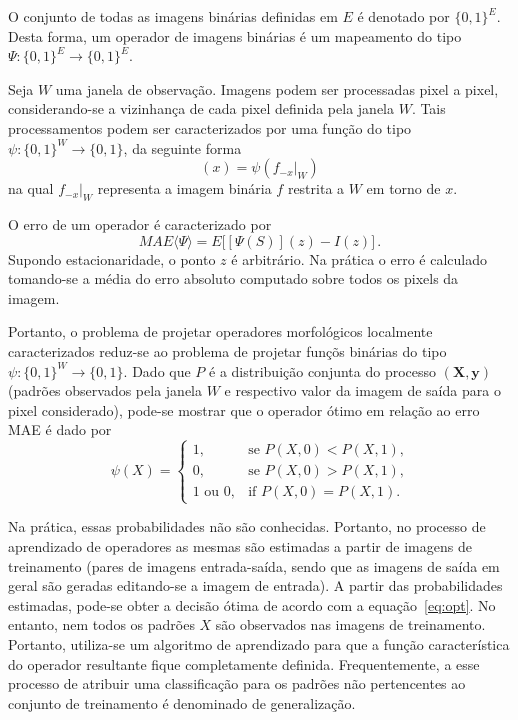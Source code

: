 \documentclass[times, 10pt,twocolumn]{article}
\begin{document}
O conjunto de todas as imagens binárias definidas em $E$ é denotado
por $\{0,1\}^E$. Desta forma, um operador de imagens binárias é um
mapeamento do tipo $\Psi: \{0,1\}^E \to \{0,1\}^E$. 

Seja $W$ uma janela de observação. Imagens podem ser processadas pixel
a pixel, considerando-se a vizinhança de cada pixel definida pela
janela $W$. Tais processamentos podem ser caracterizados por uma
função do tipo $\psi: \{0,1\}^W \to \{0,1\}$, da seguinte forma
\begin{equation}
[\Psi(f)](x) = \psi(f_{-x}|_W)
\end{equation} 
na qual $f_{-x}|_W$ representa a imagem binária $f$ restrita a $W$ em
torno de $x$. 



O erro de um operador é caracterizado por
\begin{equation}
MAE\langle \Psi \rangle = E \big[ [\Psi(S)](z) - I(z) \big]\,.
\end{equation}
Supondo estacionaridade, o ponto $z$ é arbitrário. Na prática o erro é
calculado tomando-se a média do erro absoluto computado sobre
todos os pixels da imagem.

Portanto, o problema de projetar operadores morfológicos localmente
caracterizados reduz-se ao problema de projetar funçõs binárias do
tipo $\psi: \{0,1\}^W \to \{0,1\}$.
Dado que $P$ é a distribuição conjunta do processo
$(\mathbf{X},\mathbf{y})$ (padrões observados pela janela $W$ e
respectivo valor da imagem de saída para o pixel considerado), pode-se
mostrar que o operador ótimo em relação ao erro MAE é dado por
\begin{equation}
\label{eq:opt}
\psi(X) = \left\{
          \begin{array}{ll}
          1, & \mbox{se $P(X,0)<P(X,1)$,}\\
          0, & \mbox{se $P(X,0)>P(X,1)$,}\\
          1 \mbox{ ou } 0, & \mbox{if $P(X,0)=P(X,1)$.}
          \end{array}
\right.
\end{equation}

Na prática, essas probabilidades não são conhecidas. Portanto, no
processo de aprendizado de operadores as mesmas são estimadas a partir
de imagens de treinamento (pares de imagens entrada-saída, sendo que
as imagens de saída em geral são geradas editando-se a imagem de
entrada). A partir das probabilidades estimadas, pode-se obter a
decisão ótima de acordo com a equação~\ref{eq:opt}. No entanto, nem
todos os padrões $X$ são observados nas imagens de
treinamento. Portanto, utiliza-se um algoritmo de aprendizado para que
a função característica do operador resultante fique completamente
definida. Frequentemente, a esse processo de atribuir uma
classificação para os padrões não pertencentes ao conjunto de
treinamento é denominado de generalização.
\end{document}
